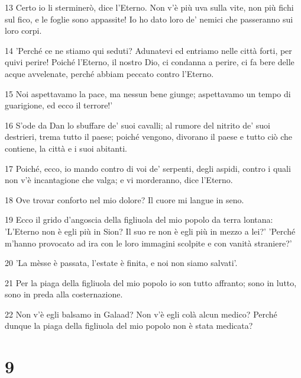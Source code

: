 \par 13 Certo io li sterminerò, dice l'Eterno. Non v'è più uva sulla vite, non più fichi sul fico, e le foglie sono appassite! Io ho dato loro de' nemici che passeranno sui loro corpi.
\par 14 'Perché ce ne stiamo qui seduti? Adunatevi ed entriamo nelle città forti, per quivi perire! Poiché l'Eterno, il nostro Dio, ci condanna a perire, ci fa bere delle acque avvelenate, perché abbiam peccato contro l'Eterno.
\par 15 Noi aspettavamo la pace, ma nessun bene giunge; aspettavamo un tempo di guarigione, ed ecco il terrore!'
\par 16 S'ode da Dan lo sbuffare de' suoi cavalli; al rumore del nitrito de' suoi destrieri, trema tutto il paese; poiché vengono, divorano il paese e tutto ciò che contiene, la città e i suoi abitanti.
\par 17 Poiché, ecco, io mando contro di voi de' serpenti, degli aspidi, contro i quali non v'è incantagione che valga; e vi morderanno, dice l'Eterno.
\par 18 Ove trovar conforto nel mio dolore? Il cuore mi langue in seno.
\par 19 Ecco il grido d'angoscia della figliuola del mio popolo da terra lontana: 'L'Eterno non è egli più in Sion? Il suo re non è egli più in mezzo a lei?' 'Perché m'hanno provocato ad ira con le loro immagini scolpite e con vanità straniere?'
\par 20 'La mèsse è passata, l'estate è finita, e noi non siamo salvati'.
\par 21 Per la piaga della figliuola del mio popolo io son tutto affranto; sono in lutto, sono in preda alla costernazione.
\par 22 Non v'è egli balsamo in Galaad? Non v'è egli colà alcun medico? Perché dunque la piaga della figliuola del mio popolo non è stata medicata?

\chapter{9}

